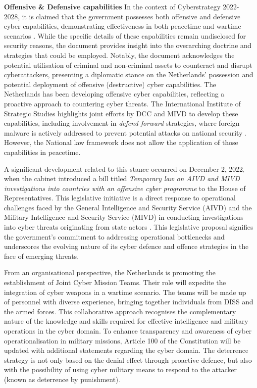 \textbf{Offensive \& Defensive capabilities} In the context of Cyberstrategy 2022-2028, it is claimed that the government possesses both offensive and defensive cyber capabilities, demonstrating effectiveness in both peacetime and wartime scenarios \autocite[38]{ministryofjusticeandsecurity_2022_netherlands}. While the specific details of these capabilities remain undisclosed for security reasons, the document provides insight into the overarching doctrine and strategies that could be employed. Notably, the document acknowledges the potential utilisation of criminal and non-criminal assets to counteract and disrupt cyberattackers, presenting a diplomatic stance on the Netherlands' possession and potential deployment of offensive (destructive) cyber capabilities. The Netherlands has been developing offensive cyber capabilities, reflecting a proactive approach to countering cyber threats. The International Institute of Strategic Studies highlights joint efforts by DCC and MIVD to develop these capabilities, including involvement in \textit{ defend forward} strategies, where foreign malware is actively addressed to prevent potential attacks on national security \autocite{theinternationalinstituteforstrategicstudies_2023_cyber}. However, the National law framework does not allow the application of those capabilities in peacetime. 

A significant development related to this stance occurred on December 2, 2022, when the cabinet introduced a bill titled \textit{Temporary law on AIVD and MIVD investigations into countries with an offensive cyber programme} to the House of Representatives. This legislative initiative is a direct response to operational challenges faced by the General Intelligence and Security Service (AIVD) and the Military Intelligence and Security Service (MIVD) in conducting investigations into cyber threats originating from state actors \autocite{nationalgovernmentofthenetherlands_2023_internationale}. This legislative proposal signifies the government's commitment to addressing operational bottlenecks and underscores the evolving nature of its cyber defence and offence strategies in the face of emerging threats.

From an organisational perspective, the Netherlands is promoting the establishment of Joint Cyber Mission Teams. Their role will expedite the integration of cyber weapons in a wartime scenario. The teams will be made up of personnel with diverse experience, bringing together individuals from DISS and the armed forces. This collaborative approach recognises the complementary nature of the knowledge and skills required for effective intelligence and military operations in the cyber domain. To enhance transparency and awareness of cyber operationalisation in military missions, Article 100 of the Constitution will be updated with additional statements regarding the cyber domain. The deterrence strategy is not only based on the denial effect through proactive defence, but also with the possibility of using cyber military means to respond to the attacker (known as deterrence by punishment). 

